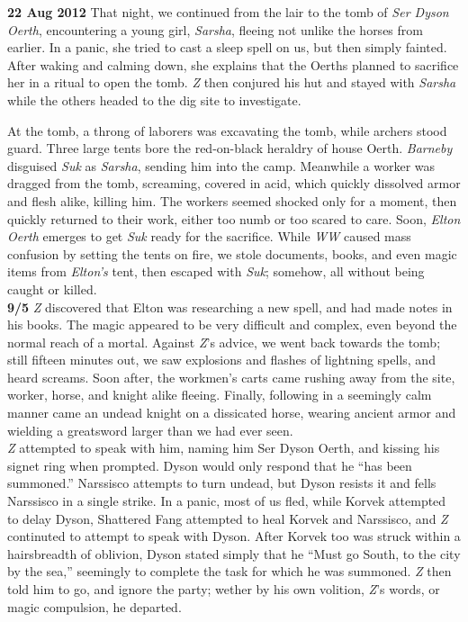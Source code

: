 \documentclass[letterpaper]{article}
\begin{document}
\textbf{22 Aug 2012} That night, we continued from the lair to the tomb of \emph{Ser Dyson Oerth}, encountering a young girl, \emph{Sarsha}, fleeing not unlike the horses from earlier. In a panic, she tried to cast a sleep spell on us, but then simply fainted. After waking and calming down, she explains that the Oerths planned to sacrifice her in a ritual to open the tomb. \emph{Z} then conjured his hut and stayed with \emph{Sarsha} while the others headed to the dig site to investigate.\par
At the tomb, a throng of laborers was excavating the tomb, while archers stood guard. Three large tents bore the red-on-black heraldry of house Oerth. \emph{Barneby} disguised \emph{Suk} as \emph{Sarsha}, sending him into the camp. Meanwhile a worker was dragged from the tomb, screaming, covered in acid, which quickly dissolved armor and flesh alike, killing him. The workers seemed shocked only for a moment, then quickly returned to their work, either too numb or too scared to care. Soon, \emph{Elton Oerth} emerges to get \emph{Suk} ready for the sacrifice. While \emph{WW} caused mass confusion by setting the tents on fire, we stole documents, books, and even magic items from \emph{Elton's} tent, then escaped with \emph{Suk}; somehow, all without being caught or killed.\\

\noindent \textbf{9/5} \emph{Z} discovered that Elton was researching a new spell, and had made notes in his books.  The magic appeared to be very difficult and complex, even beyond the normal reach of a mortal.  Against \emph{Z}'s advice, we went back towards the tomb; still fifteen minutes out, we saw explosions and flashes of lightning spells, and heard screams.  Soon after, the workmen's carts came rushing away from the site, worker, horse, and knight alike fleeing.  Finally, following in a seemingly calm manner came an undead knight on a dissicated horse, wearing ancient armor and wielding a greatsword larger than we had ever seen.\\

\noindent \emph{Z} attempted to speak with him, naming him Ser Dyson Oerth, and kissing his signet ring when prompted.  Dyson would only respond that he ``has been summoned.'' Narssisco attempts to turn undead, but Dyson resists it and fells Narssisco in a single strike.  In a panic, most of us fled, while Korvek attempted to delay Dyson, Shattered Fang attempted to heal Korvek and Narssisco, and \emph{Z} continuted to attempt to speak with Dyson.  After Korvek too was struck within a hairsbreadth of oblivion, Dyson stated simply that he ``Must go South, to the city by the sea,'' seemingly to complete the task for which he was summoned.  \emph{Z} then told him to go, and ignore the party; wether by his own volition, \emph{Z}'s words, or magic compulsion, he departed.\\
\end{document}
